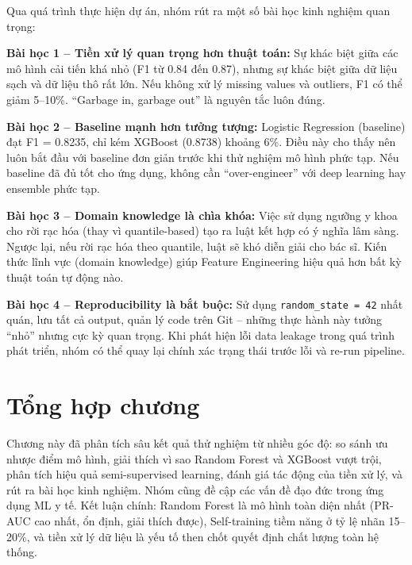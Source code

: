 Qua quá trình thực hiện dự án, nhóm rút ra một số bài học kinh nghiệm quan trọng:

\textbf{Bài học 1 -- Tiền xử lý quan trọng hơn thuật toán:} Sự khác biệt giữa các mô hình cải tiến khá nhỏ (F1 từ 0.84 đến 0.87), nhưng sự khác biệt giữa dữ liệu sạch và dữ liệu thô rất lớn. Nếu không xử lý missing values và outliers, F1 có thể giảm 5--10\%. ``Garbage in, garbage out'' là nguyên tắc luôn đúng.

\textbf{Bài học 2 -- Baseline mạnh hơn tưởng tượng:} Logistic Regression (baseline) đạt F1 = 0.8235, chỉ kém XGBoost (0.8738) khoảng 6\%. Điều này cho thấy nên luôn bắt đầu với baseline đơn giản trước khi thử nghiệm mô hình phức tạp. Nếu baseline đã đủ tốt cho ứng dụng, không cần ``over-engineer'' với deep learning hay ensemble phức tạp.

\textbf{Bài học 3 -- Domain knowledge là chìa khóa:} Việc sử dụng ngưỡng y khoa cho rời rạc hóa (thay vì quantile-based) tạo ra luật kết hợp có ý nghĩa lâm sàng. Ngược lại, nếu rời rạc hóa theo quantile, luật sẽ khó diễn giải cho bác sĩ. Kiến thức lĩnh vực (domain knowledge) giúp Feature Engineering hiệu quả hơn bất kỳ thuật toán tự động nào.

\textbf{Bài học 4 -- Reproducibility là bắt buộc:} Sử dụng \texttt{random\_state = 42} nhất quán, lưu tất cả output, quản lý code trên Git -- những thực hành này tưởng ``nhỏ'' nhưng cực kỳ quan trọng. Khi phát hiện lỗi data leakage trong quá trình phát triển, nhóm có thể quay lại chính xác trạng thái trước lỗi và re-run pipeline.

\section{Tổng hợp chương}

Chương này đã phân tích sâu kết quả thử nghiệm từ nhiều góc độ: so sánh ưu nhược điểm mô hình, giải thích vì sao Random Forest và XGBoost vượt trội, phân tích hiệu quả semi-supervised learning, đánh giá tác động của tiền xử lý, và rút ra bài học kinh nghiệm. Nhóm cũng đề cập các vấn đề đạo đức trong ứng dụng ML y tế. Kết luận chính: Random Forest là mô hình toàn diện nhất (PR-AUC cao nhất, ổn định, giải thích được), Self-training tiềm năng ở tỷ lệ nhãn 15--20\%, và tiền xử lý dữ liệu là yếu tố then chốt quyết định chất lượng toàn hệ thống.
